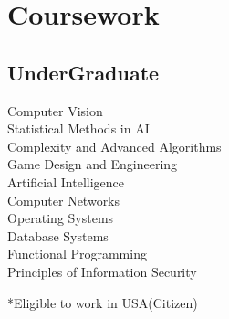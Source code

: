 \documentclass[]{deedy-resume-openfont}
\begin{document}
\begin{minipage}[t]{0.33\textwidth}
\section{Coursework}
\subsection{UnderGraduate}
Computer Vision \\
Statistical Methods in AI \\
Complexity and Advanced Algorithms \\
Game Design and Engineering \\
Artificial Intelligence \\
Computer Networks \\
Operating Systems \\
Database Systems \\
Functional Programming \\
Principles of Information Security\\
\sectionsep

*Eligible to work in USA(Citizen)


%
%

\end{minipage} 
\hfill
\end{document}
